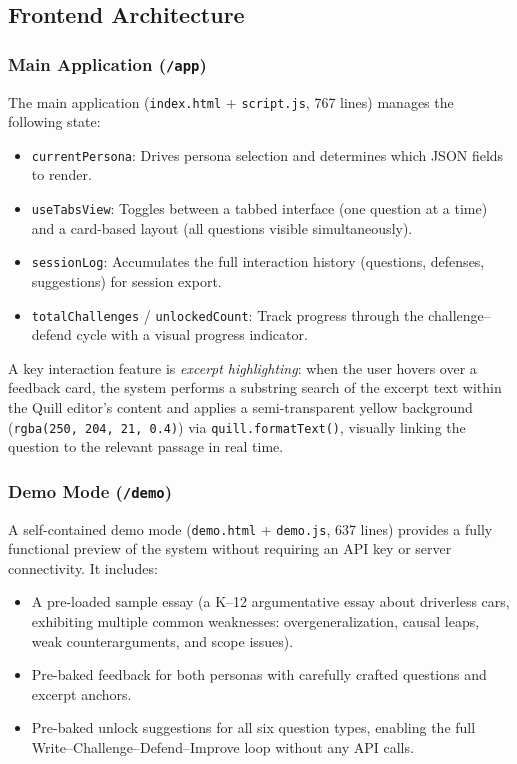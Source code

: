 \documentclass[11pt,a4paper]{article}
\begin{document}
\subsection{Frontend Architecture}

\subsubsection{Main Application (\texttt{/app})}

The main application (\texttt{index.html} + \texttt{script.js}, 767 lines) manages the following state:

\begin{itemize}[leftmargin=*]
    \item \texttt{currentPersona}: Drives persona selection and determines which JSON fields to render.
    \item \texttt{useTabsView}: Toggles between a tabbed interface (one question at a time) and a card-based layout (all questions visible simultaneously).
    \item \texttt{sessionLog}: Accumulates the full interaction history (questions, defenses, suggestions) for session export.
    \item \texttt{totalChallenges} / \texttt{unlockedCount}: Track progress through the challenge--defend cycle with a visual progress indicator.
\end{itemize}

A key interaction feature is \textit{excerpt highlighting}: when the user hovers over a feedback card, the system performs a substring search of the excerpt text within the Quill editor's content and applies a semi-transparent yellow background (\texttt{rgba(250, 204, 21, 0.4)}) via \texttt{quill.formatText()}, visually linking the question to the relevant passage in real time.

\subsubsection{Demo Mode (\texttt{/demo})}

A self-contained demo mode (\texttt{demo.html} + \texttt{demo.js}, 637 lines) provides a fully functional preview of the system without requiring an API key or server connectivity. It includes:

\begin{itemize}[leftmargin=*]
    \item A pre-loaded sample essay (a K--12 argumentative essay about driverless cars, exhibiting multiple common weaknesses: overgeneralization, causal leaps, weak counterarguments, and scope issues).
    \item Pre-baked feedback for both personas with carefully crafted questions and excerpt anchors.
    \item Pre-baked unlock suggestions for all six question types, enabling the full Write--Challenge--Defend--Improve loop without any API calls.
\end{itemize}
\end{document}
